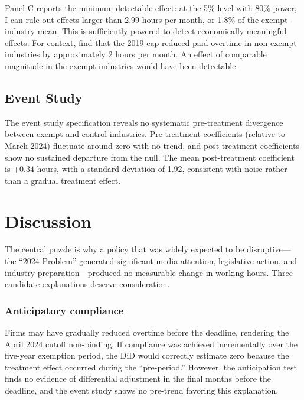 \documentclass[12pt]{article}
\begin{document}
Panel C reports the minimum detectable effect: at the 5\% level with 80\% power, I can rule out effects larger than 2.99 hours per month, or 1.8\% of the exempt-industry mean. This is sufficiently powered to detect economically meaningful effects. For context, \citet{burdin2024} find that the 2019 cap reduced paid overtime in non-exempt industries by approximately 2 hours per month. An effect of comparable magnitude in the exempt industries would have been detectable.

\subsection{Event Study}

The event study specification reveals no systematic pre-treatment divergence between exempt and control industries. Pre-treatment coefficients (relative to March 2024) fluctuate around zero with no trend, and post-treatment coefficients show no sustained departure from the null. The mean post-treatment coefficient is $+0.34$ hours, with a standard deviation of 1.92, consistent with noise rather than a gradual treatment effect.

\section{Discussion}

The central puzzle is why a policy that was widely expected to be disruptive---the ``2024 Problem'' generated significant media attention, legislative action, and industry preparation---produced no measurable change in working hours. Three candidate explanations deserve consideration.

\subsubsection*{Anticipatory compliance} Firms may have gradually reduced overtime before the deadline, rendering the April 2024 cutoff non-binding. If compliance was achieved incrementally over the five-year exemption period, the DiD would correctly estimate zero because the treatment effect occurred during the ``pre-period.'' However, the anticipation test finds no evidence of differential adjustment in the final months before the deadline, and the event study shows no pre-trend favoring this explanation.
\end{document}
